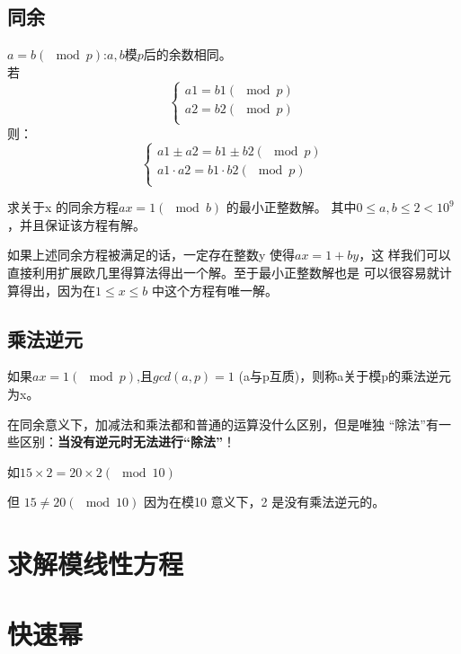 \documentclass[lang=cn,11pt]{elegantbook}
\begin{document}
	\subsection{同余}
	$a=b(\mod p)$:$a,b$模$p$后的余数相同。\\
	若\[
	\begin{cases}
	a1=b1(\mod p)\\
	a2=b2(\mod p)\\
	\end{cases}
	\]
	则：	\[
	\begin{cases}
	a1\pm a2=b1 \pm b2 (\mod p)\\
	a1\cdot a2=b1 \cdot b2 (\mod p)\\
	\end{cases}
	\]
	\begin{example}
	求关于x 的同余方程$ax =1 (\mod b)$ 的最小正整数解。
	其中$0 \leq a, b \leq 2<10^9$，并且保证该方程有解。
	
	如果上述同余方程被满足的话，一定存在整数y 使得$ax = 1+by$，这
	样我们可以直接利用扩展欧几里得算法得出一个解。至于最小正整数解也是
	可以很容易就计算得出，因为在$1 \leq x \leq b$ 中这个方程有唯一解。
\end{example}
	\subsection{乘法逆元}
	如果$ax=1 (\mod p)$,且$gcd(a,p)=1$ (a与p互质)，则称a关于模p的乘法逆元为x。
	
	在同余意义下，加减法和乘法都和普通的运算没什么区别，但是唯独
	“除法”有一些区别：\textbf{当没有逆元时无法进行“除法”}！
	
	如$15\times 2 = 20\times 2 (\mod 10)$
	
	但	$15\neq 20 (\mod 10)$
	因为在模10 意义下，2 是没有乘法逆元的。
	
	\section{求解模线性方程}

	
	\section{快速幂}
\end{document}
